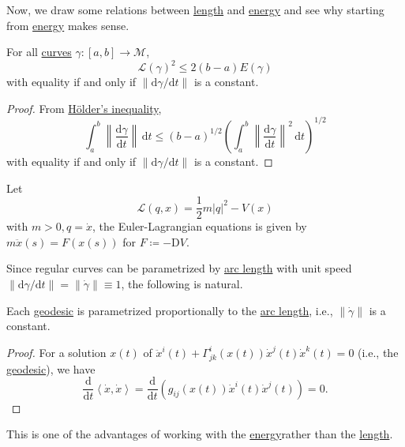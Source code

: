 Now, we draw some relations between \hyperref[def:length]{length} and \hyperref[def:energy]{energy} and see why starting from \hyperref[def:energy]{energy} makes sense.

\begin{proposition}
	For all \hyperref[def:curve]{curves} \(\gamma \colon [a, b] \to \mathcal{M} \),
	\[
		\mathcal{L} (\gamma )^2 \leq 2(b-a) E(\gamma )
	\]
	with equality if and only if \(\lVert \mathrm{d} \gamma / \mathrm{d} t \rVert \) is a constant.
\end{proposition}
\begin{proof}
	From \href{https://en.wikipedia.org/wiki/H%C3%B6lder%27s_inequality}{Hölder's inequality},
	\[
		\int_{a}^{b} \left\lVert \frac{\mathrm{d}\gamma }{\mathrm{d}t} \right\rVert \,\mathrm{d}t
		\leq (b-a)^{1 / 2} \left( \int_{a}^{b} \left\lVert \frac{\mathrm{d}\gamma }{\mathrm{d}t} \right\rVert ^2 \,\mathrm{d}t \right) ^{1 / 2}
	\]
	with equality if and only if \(\lVert \mathrm{d} \gamma / \mathrm{d} t \rVert\) is a constant.
\end{proof}

\begin{eg}
	Let
	\[
		\mathcal{L} (q, x) = \frac{1}{2} m \vert q \vert ^2 - V(x)
	\]
	with \(m > 0, q = \dot{x}\), the Euler-Lagrangian equations is given by \(m\ddot{x} (s) = F(x(s))\) for \(F\coloneqq -\mathrm{D} V\).
\end{eg}

Since regular curves can be parametrized by \hyperref[def:length]{arc length} with unit speed \(\lVert \mathrm{d} \gamma / \mathrm{d} t \rVert = \lVert \dot{\gamma } \rVert \equiv 1\), the following is natural.

\begin{lemma}
	Each \hyperref[def:geodesic]{geodesic} is parametrized proportionally to the \hyperref[def:length]{arc length}, i.e., \(\lVert \dot{\gamma } \rVert \) is a constant.
\end{lemma}
\begin{proof}
	For a solution \(x(t)\) of \(\ddot{x}^i(t) + \Gamma ^{i}_{jk}(x(t)) \dot{x}^j(t)\dot{x}^k(t) = 0\) (i.e., the \hyperref[def:geodesic]{geodesic}), we have
	\[
		\frac{\mathrm{d}}{\mathrm{d}t} \left\langle \dot{x}, \dot{x} \right\rangle
		= \frac{\mathrm{d}}{\mathrm{d}t} \left( g_{ij} (x(t)) \dot{x}^i(t)\dot{x}^j(t)\right)
		=0.
	\]
\end{proof}

\begin{remark}
	This is one of the advantages of working with the \hyperref[def:energy]{energy}rather than the \hyperref[def:length]{length}.
\end{remark}

